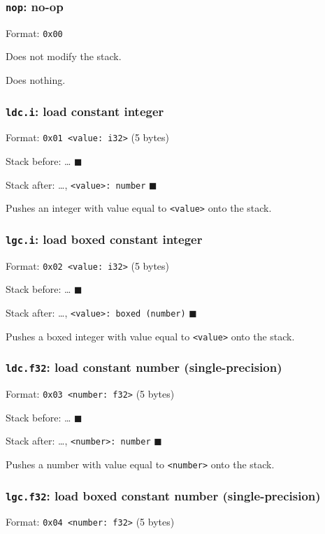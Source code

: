 \subsubsection{\texttt{nop}: no-op}
\label{sec:orgbc7ec8d}
Format: \texttt{0x00}

Does not modify the stack.

Does nothing.

\subsubsection{\texttt{ldc.i}: load constant integer}
\label{sec:orgc756866}
Format: \texttt{0x01 <value: i32>} (5 bytes)

Stack before: \ldots{} \(\blacksquare\)

Stack after: \ldots{}, \texttt{<value>: number} \(\blacksquare\)

Pushes an integer with value equal to \texttt{<value>} onto the stack.

\subsubsection{\texttt{lgc.i}: load boxed constant integer}
\label{sec:org5cf9345}
Format: \texttt{0x02 <value: i32>} (5 bytes)

Stack before: \ldots{} \(\blacksquare\)

Stack after: \ldots{}, \texttt{<value>: boxed (number)} \(\blacksquare\)

Pushes a boxed integer with value equal to \texttt{<value>} onto the stack.

\subsubsection{\texttt{ldc.f32}: load constant number (single-precision)}
\label{sec:orgd3689f6}
Format: \texttt{0x03 <number: f32>} (5 bytes)

Stack before: \ldots{} \(\blacksquare\)

Stack after: \ldots{}, \texttt{<number>: number} \(\blacksquare\)

Pushes a number with value equal to \texttt{<number>} onto the stack.

\subsubsection{\texttt{lgc.f32}: load boxed constant number (single-precision)}
\label{sec:orgee247e4}
Format: \texttt{0x04 <number: f32>} (5 bytes)


